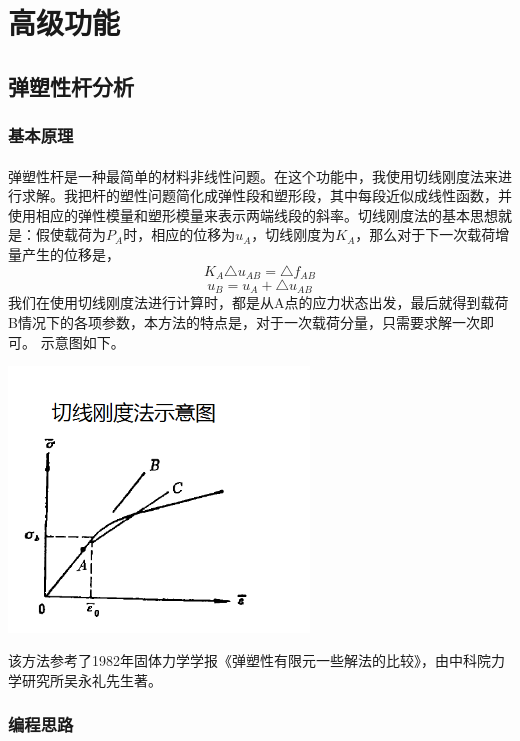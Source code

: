 \documentclass[UTF8]{ctexbook}
\begin{document}
\section{高级功能}
\subsection{弹塑性杆分析}





\subsubsection{基本原理}
\paragraph{}
弹塑性杆是一种最简单的材料非线性问题。在这个功能中，我使用切线刚度法来进行求解。我把杆的塑性问题简化成弹性段和塑形段，其中每段近似成线性函数，并使用相应的弹性模量和塑形模量来表示两端线段的斜率。切线刚度法的基本思想就是：假使载荷为$P_A$时，相应的位移为$u_A$，切线刚度为$K_A$，那么对于下一次载荷增量产生的位移是，
$$K_A\triangle u_{AB}=\triangle f_{AB}$$
$$u_B=u_A+\triangle u_{AB}$$
我们在使用切线刚度法进行计算时，都是从A点的应力状态出发，最后就得到载荷B情况下的各项参数，本方法的特点是，对于一次载荷分量，只需要求解一次即可。
示意图如下。
\begin{center}
\includegraphics[width=0.6\textwidth]{plastic7.png}
\end{center}
该方法参考了1982年固体力学学报《弹塑性有限元一些解法的比较》，由中科院力学研究所吴永礼先生著。
\subsubsection{编程思路}
\end{document}
